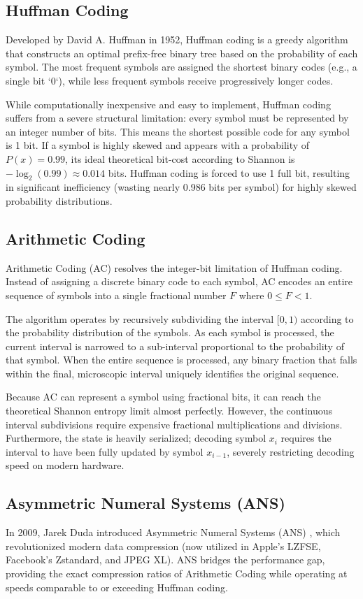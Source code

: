 \subsection{Huffman Coding}
Developed by David A. Huffman in 1952, Huffman coding is a greedy algorithm that constructs an optimal prefix-free binary tree based on the probability of each symbol. The most frequent symbols are assigned the shortest binary codes (e.g., a single bit `0`), while less frequent symbols receive progressively longer codes.

While computationally inexpensive and easy to implement, Huffman coding suffers from a severe structural limitation: every symbol must be represented by an integer number of bits. This means the shortest possible code for any symbol is 1 bit. If a symbol is highly skewed and appears with a probability of $P(x) = 0.99$, its ideal theoretical bit-cost according to Shannon is $-\log_2(0.99) \approx 0.014$ bits. Huffman coding is forced to use 1 full bit, resulting in significant inefficiency (wasting nearly 0.986 bits per symbol) for highly skewed probability distributions.

\subsection{Arithmetic Coding}
Arithmetic Coding (AC) resolves the integer-bit limitation of Huffman coding. Instead of assigning a discrete binary code to each symbol, AC encodes an entire sequence of symbols into a single fractional number $F$ where $0 \le F < 1$. 

The algorithm operates by recursively subdividing the interval $[0, 1)$ according to the probability distribution of the symbols. As each symbol is processed, the current interval is narrowed to a sub-interval proportional to the probability of that symbol. When the entire sequence is processed, any binary fraction that falls within the final, microscopic interval uniquely identifies the original sequence.

Because AC can represent a symbol using fractional bits, it can reach the theoretical Shannon entropy limit almost perfectly. However, the continuous interval subdivisions require expensive fractional multiplications and divisions. Furthermore, the state is heavily serialized; decoding symbol $x_i$ requires the interval to have been fully updated by symbol $x_{i-1}$, severely restricting decoding speed on modern hardware.

\subsection{Asymmetric Numeral Systems (ANS)}
In 2009, Jarek Duda introduced Asymmetric Numeral Systems (ANS) \cite{duda2009asymmetric}, which revolutionized modern data compression (now utilized in Apple's LZFSE, Facebook's Zstandard, and JPEG XL). ANS bridges the performance gap, providing the exact compression ratios of Arithmetic Coding while operating at speeds comparable to or exceeding Huffman coding.

